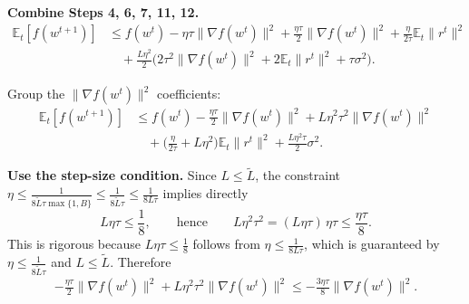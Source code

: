 \documentclass{article}
\begin{document}
\textbf{Combine Steps 4, 6, 7, 11, 12.}
\begin{align}
\mathbb{E}_t[f(w^{t+1})]
&\le f(w^t) - \eta\tau\|\nabla f(w^t)\|^2
 + \frac{\eta\tau}{2}\|\nabla f(w^t)\|^2 + \frac{\eta}{2\tau}\mathbb{E}_t\|r^t\|^2 \nonumber\\
&\quad + \frac{L\eta^2}{2}\Big(2\tau^2\|\nabla f(w^t)\|^2 + 2\mathbb{E}_t\|r^t\|^2 + \tau\sigma^2\Big).
\tag{Step 13}
\end{align}

Group the $\|\nabla f(w^t)\|^2$ coefficients:
\begin{align}
\mathbb{E}_t[f(w^{t+1})]
&\le f(w^t) - \frac{\eta\tau}{2}\|\nabla f(w^t)\|^2 + L\eta^2\tau^2\|\nabla f(w^t)\|^2 \nonumber\\
&\quad + \Big(\frac{\eta}{2\tau} + L\eta^2\Big)\mathbb{E}_t\|r^t\|^2
 + \frac{L\eta^2\tau}{2}\sigma^2 .
\tag{Step 14}
\end{align}

\textbf{Use the step-size condition.}
Since $L \le \tilde L$, the constraint $\eta \le \frac{1}{8\tilde L\tau\max\{1,B\}} \le \frac{1}{8\tilde L\tau} \le \frac{1}{8 L\tau}$ implies directly
\[
L\eta\tau \le \frac{1}{8}, \qquad\text{hence}\qquad L\eta^2\tau^2 = (L\eta\tau)\,\eta\tau \le \frac{\eta\tau}{8}.
\]
This is rigorous because $L\eta\tau \le \tfrac18$ follows from $\eta \le \tfrac{1}{8L\tau}$, which is guaranteed by $\eta \le \tfrac{1}{8\tilde L\tau}$ and $L \le \tilde L$. Therefore
\begin{align}
- \frac{\eta\tau}{2}\|\nabla f(w^t)\|^2 + L\eta^2\tau^2\|\nabla f(w^t)\|^2
\le -\frac{3\eta\tau}{8}\|\nabla f(w^t)\|^2 .
\tag{Step 15}
\end{align}
\end{document}
